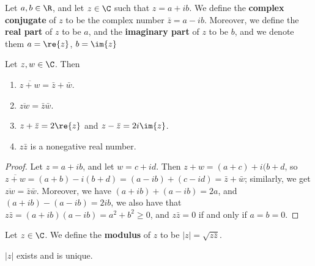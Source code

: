 \begin{definition}
    Let $a,b \in \R$, and let  $z \in \C$ such that  $z=a+ib$. We define the  \textbf{complex 
    conjugate} of $z$ to be the complex number  $\bar{z}=a-ib$. Moreover, we define the 
    \textbf{real part} of  $z$ to be $a$, and the \textbf{imaginary part} of  $z$ to be $b$, 
    and we denote them $a=\re{z}$,  $b=\im{z}$
\end{definition}

\begin{theorem}\label{1.4.5}
    Let $z, w \in \C$. Then 
        \begin{enumerate}[label=(\arabic*)]
            \item $\overline{z+w}=\bar{z}+\bar{w}$.

            \item $\overline{zw}=\bar{z}\bar{w}$.

            \item $z+\bar{z}=2\re{z}$ and  $z-\bar{z}=2i\im{z}$.

            \item $z\bar{z}$ is a nonegative real number.
        \end{enumerate}
\end{theorem}
\begin{proof}
    Let $z=a+ib$, and let  $w=c+id$. Then $z+w=(a+c)+i(b+d$, so  $\overline{z+w}=(a+b)
    -i(b+d)=(a-ib)+(c-id)=\bar{z}+\bar{w}$; similarly, we get  $\overline{zw}=\bar{z}\bar{w}$. 
    Moreover, we have  $(a+ib)+(a-ib)=2a$, and  $(a+ib)-(a-ib)=2ib$, we also have that 
    $z\bar{z}=(a+ib)(a-ib)=a^2+b^2 \geq 0$, and $z\bar{z}=0$ if and only if $a=b=0$.
\end{proof}

\begin{definition}
    Let $z \in \C$. We define the  \textbf{modulus} of  $z$ to be  $|z|=\sqrt{z\bar{z}}$.
\end{definition}
\begin{remark}
    $|z|$ exists and is unique.
\end{remark}

